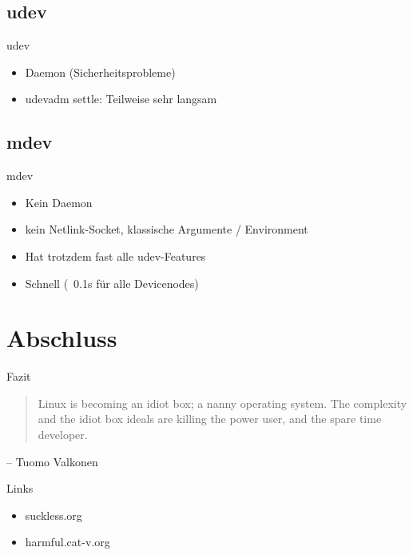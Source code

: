 \documentclass{beamer}
\begin{document}
\subsection{udev}
\begin{frame}{udev}
	\begin{itemize}
		\item Daemon (Sicherheitsprobleme)
		\pause \item udevadm settle: Teilweise sehr langsam
	\end{itemize}
\end{frame}

\subsection{mdev}
\begin{frame}{mdev}
	\begin{itemize}
		\item Kein Daemon
		\pause \item kein Netlink-Socket, klassische
			Argumente / Environment
		\pause \item Hat trotzdem fast alle udev-Features
		\pause \item Schnell (~0.1s für alle Devicenodes)
	\end{itemize}
\end{frame}

\section{Abschluss}

\begin{frame}{Fazit}
	\begin{quote}
		Linux is becoming an idiot box; a nanny operating system. The
		complexity and
		the idiot box ideals are killing the power user, and the spare time
		developer.
	\end{quote}
	\begin{flushright}
		-- Tuomo Valkonen
	\end{flushright}
\end{frame}

\begin{frame}{Links}
	\begin{itemize}
		\item suckless.org
		\item harmful.cat-v.org
	\end{itemize}
\end{frame}
\end{document}
